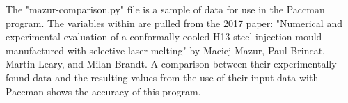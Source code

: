 \documentclass[a4paper,12pt]{article}
\begin{document}
\setlength{\parindent}{0em}
\doublespacing
\captionsetup{labelformat=empty}

The "mazur-comparison.py" file is a sample of data for use in the Paccman program. The variables within are pulled from the  2017 paper: "Numerical and experimental evaluation of a conformally cooled H13 steel injection mould manufactured with selective laser melting" by Maciej Mazur, Paul Brincat, Martin Leary, and Milan Brandt. A comparison between their experimentally found data and the resulting values from the use of their input data with Paccman  shows the accuracy of this program.
\end{document}
